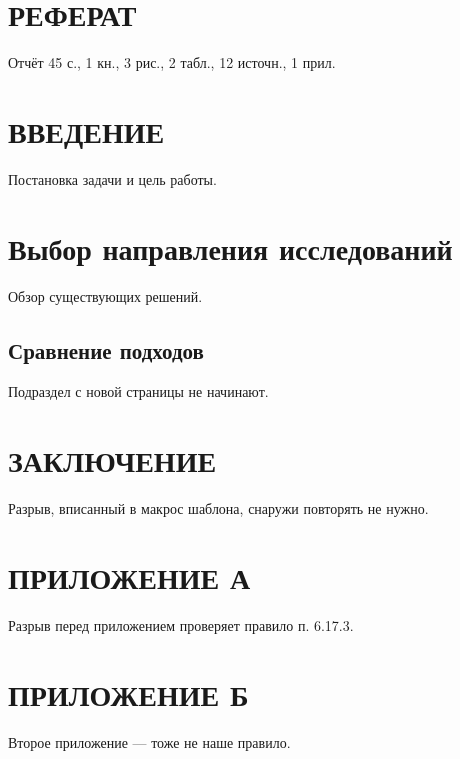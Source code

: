 \newcommand{\element}[1]{\newpage\section*{\centering #1}}



\section*{РЕФЕРАТ}

Отчёт 45 с., 1 кн., 3 рис., 2 табл., 12 источн., 1 прил.

\newpage
\section*{ВВЕДЕНИЕ}

Постановка задачи и цель работы.

\clearpage
\section{Выбор направления исследований}

Обзор существующих решений.

\subsection{Сравнение подходов}

Подраздел с новой страницы не начинают.

\element{ЗАКЛЮЧЕНИЕ}

Разрыв, вписанный в макрос шаблона, снаружи повторять не нужно.

\newpage
\section*{ПРИЛОЖЕНИЕ А}

Разрыв перед приложением проверяет правило п. 6.17.3.

\section*{ПРИЛОЖЕНИЕ Б}

Второе приложение — тоже не наше правило.


